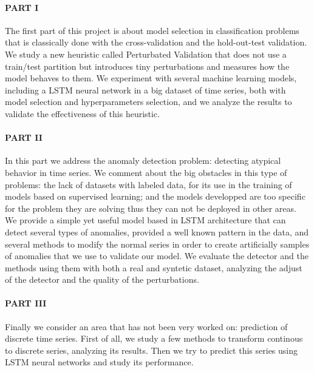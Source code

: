 \paragraph{PART I} The first part of this project is about model selection in classification problems that is classically done with the cross-validation and the hold-out-test validation. We study a new heuristic called Perturbated Validation that does not use a train/test partition but introduces tiny perturbations and measures how the model behaves to them. We experiment with several machine learning models, including a LSTM neural network in a big dataset of time series, both with model selection and hyperparameters selection, and we analyze the results to validate the effectiveness of this heuristic.

\paragraph{PART II} In this part we address the anomaly detection problem: detecting atypical behavior in time series.
We comment about the big obstacles in this type of problems: the lack of datasets with labeled data, for its use in the training of models based on supervised learning; and the models developped are too specific for the problem they are solving thus they can not be deployed in other areas. We provide a simple yet useful model based in LSTM architecture that can detect several types of anomalies, provided a well known pattern in the data, and several methods to modify the normal series in order to create artificially samples of anomalies that we use to validate our model. We evaluate the detector and the methods using them with both a real and syntetic dataset, analyzing the adjust of the detector and the quality of the perturbations.

\paragraph{PART III} Finally we consider an area that has not been very worked on: prediction of discrete time series. First of all, we study a few methods to transform continous to discrete series, analyzing its results. Then we try to predict this series using LSTM neural networks and study its performance.

